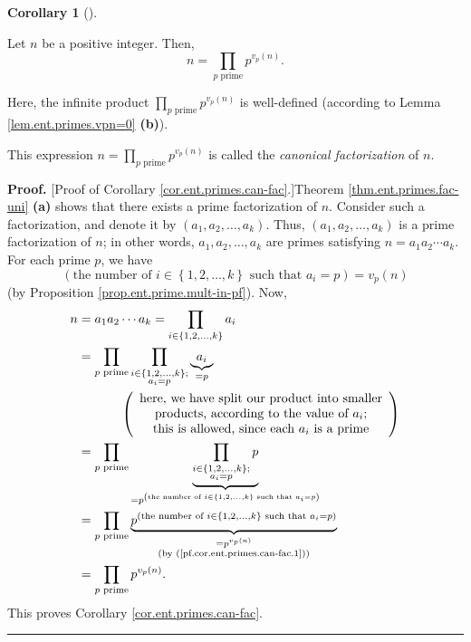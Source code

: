 \documentclass[numbers=enddot,12pt,final,onecolumn,notitlepage]{scrartcl}%
\numberwithin{exer}{subsection}
\theoremstyle{definition}
\newtheorem{coro}[theo]{Corollary}
\newenvironment{corollary}[1][]
{\begin{coro}[#1]\begin{leftbar}}
{\end{leftbar}\end{coro}}
\newenvironment{proof}[1][Proof]{\noindent\textbf{#1.} }{\ \rule{0.5em}{0.5em}}
\let\prodnonlimits\prod
\renewcommand{\prod}{\prodnonlimits\limits}
\begin{document}
\begin{corollary}
\label{cor.ent.primes.can-fac}Let $n$ be a positive integer. Then,%
\[
n=\prod_{p\text{ prime}}p^{v_{p}\left(  n\right)  }.
\]


Here, the infinite product $\prod_{p\text{ prime}}p^{v_{p}\left(  n\right)  }$
is well-defined (according to Lemma \ref{lem.ent.primes.vpn=0} \textbf{(b)}).
\end{corollary}

This expression $n=\prod_{p\text{ prime}}p^{v_{p}\left(  n\right)  }$ is
called the \textit{canonical factorization} of $n$.

\begin{proof}
[Proof of Corollary \ref{cor.ent.primes.can-fac}.]Theorem
\ref{thm.ent.primes.fac-uni} \textbf{(a)} shows that there exists a prime
factorization of $n$. Consider such a factorization, and denote it by $\left(
a_{1},a_{2},\ldots,a_{k}\right)  $. Thus, $\left(  a_{1},a_{2},\ldots
,a_{k}\right)  $ is a prime factorization of $n$; in other words, $a_{1}%
,a_{2},\ldots,a_{k}$ are primes satisfying $n=a_{1}a_{2}\cdots a_{k}$. For
each prime $p$, we have%
\begin{equation}
\left(  \text{the number of }i\in\left\{  1,2,\ldots,k\right\}  \text{ such
that }a_{i}=p\right)  =v_{p}\left(  n\right)
\label{pf.cor.ent.primes.can-fac.1}%
\end{equation}
(by Proposition \ref{prop.ent.prime.mult-in-pf}). Now,%
\begin{align*}
n  &  =a_{1}a_{2}\cdots a_{k}=\prod_{i\in\left\{  1,2,\ldots,k\right\}  }%
a_{i}\\
&  =\prod_{p\text{ prime}}\prod_{\substack{i\in\left\{  1,2,\ldots,k\right\}
;\\a_{i}=p}}\underbrace{a_{i}}_{=p}\\
&  \ \ \ \ \ \ \ \ \ \ \left(
\begin{array}
[c]{c}%
\text{here, we have split our product into smaller}\\
\text{products, according to the value of }a_{i}\text{;}\\
\text{this is allowed, since each }a_{i}\text{ is a prime}%
\end{array}
\right) \\
&  =\prod_{p\text{ prime}}\underbrace{\prod_{\substack{i\in\left\{
1,2,\ldots,k\right\}  ;\\a_{i}=p}}p}_{=p^{\left(  \text{the number of }%
i\in\left\{  1,2,\ldots,k\right\}  \text{ such that }a_{i}=p\right)  }}\\
&  =\prod_{p\text{ prime}}\underbrace{p^{\left(  \text{the number of }%
i\in\left\{  1,2,\ldots,k\right\}  \text{ such that }a_{i}=p\right)  }%
}_{\substack{=p^{v_{p}\left(  n\right)  }\\\text{(by
(\ref{pf.cor.ent.primes.can-fac.1}))}}}\\
&  =\prod_{p\text{ prime}}p^{v_{p}\left(  n\right)  }.
\end{align*}
This proves Corollary \ref{cor.ent.primes.can-fac}.
\end{proof}
\end{document}
